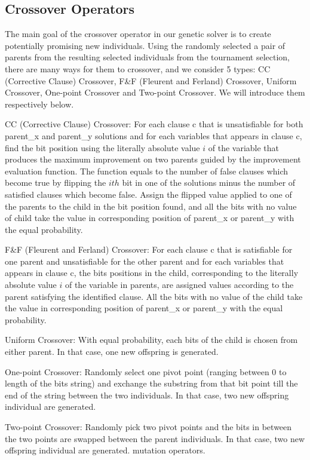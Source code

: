 \subsection{Crossover Operators}
The main goal of the crossover operator in our genetic solver is to create potentially promising new individuals. Using the randomly selected a pair of parents from the resulting selected individuals from the tournament selection, there are many ways for them to crossover, and we consider 5 types: CC (Corrective Clause) Crossover, F\&F (Fleurent and Ferland) Crossover, Uniform Crossover, One-point Crossover and Two-point Crossover. We will introduce them respectively below.

CC (Corrective Clause) Crossover:
For each clause c that is unsatisfiable for both parent\_x and parent\_y solutions and for each variables that appears in clause c, find the bit position using the literally absolute value $i$ of the variable that produces the maximum improvement on two parents guided by the improvement evaluation function. The function equals to the number of false clauses which become true by ﬂipping the $ith$ bit in one of the solutions minus the number of satisﬁed clauses which become false. Assign the flipped value applied to one of the parents to the child in the bit position found, and all the bits with no value of child take the value in corresponding position of parent\_x or parent\_y with the equal probability.

F\&F (Fleurent and Ferland) Crossover:
For each clause c that is satisfiable for one parent and unsatisfiable for the other parent and for each variables that appears in clause c, the bits positions in the child, corresponding to the literally absolute value $i$ of the variable in parents, are assigned values according to the parent satisfying the identified clause. All the bits with no value of the child take the value in corresponding position of parent\_x or parent\_y with the equal probability.

Uniform Crossover:
With equal probability, each bits of the child is chosen from either parent. In that case, one new offspring is generated.

One-point Crossover:
Randomly select one pivot point (ranging between 0 to length of the bits string) and exchange the substring from that bit point till the end of the string between the two individuals. In that case, two new offspring individual are generated.

Two-point Crossover:
Randomly pick two pivot points and the bits in between the two points are swapped between the parent individuals. In that case, two new offspring individual are generated.
mutation operators.\\
